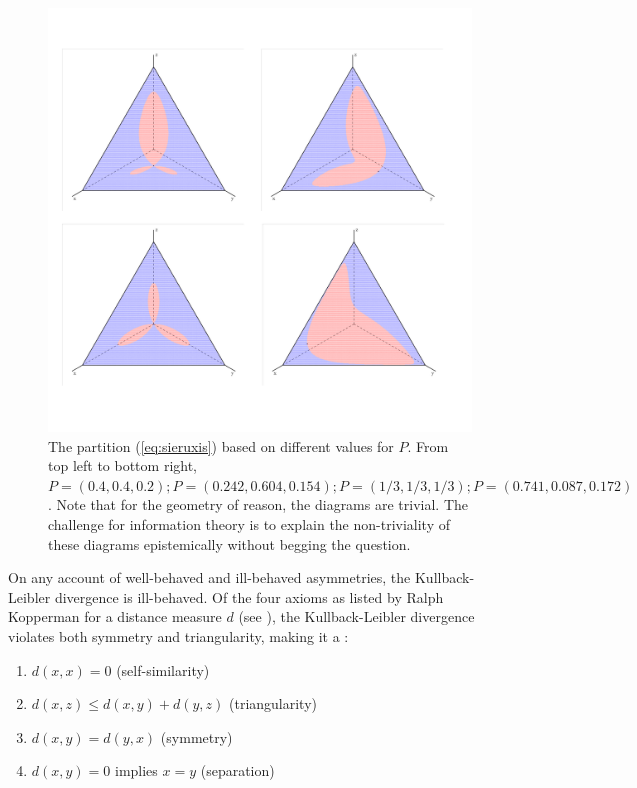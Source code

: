\documentclass[smallextended]{svjour3}       %
\begin{document}
\begin{figure}[ht]
  \begin{flushright}
    \begin{minipage}[h]{\linewidth}
      \includegraphics[width=\textwidth]{concat2.png}
      \caption{\footnotesize The partition (\ref{eq:sieruxis}) based
        on different values for $P$. From top left to bottom right,
        $P=(0.4,0.4,0.2); P=(0.242,0.604,0.154); P=(1/3,1/3,1/3);
        P=(0.741,0.087,0.172)$.
        Note that for the geometry of reason, the diagrams are
        trivial. The challenge for information theory is to explain
        the non-triviality of these diagrams epistemically without
        begging the question.}
      \label{fig:concat}
    \end{minipage}
  \end{flushright}
\end{figure}

On any account of well-behaved and ill-behaved asymmetries, the
Kullback-Leibler divergence is ill-behaved. Of the four axioms as
listed by Ralph Kopperman for a distance measure $d$ (see
), the Kullback-Leibler divergence violates
both symmetry and triangularity, making it a :

\begin{enumerate}[(m1)]
\item $d(x,x)=0$ (self-similarity)
\item $d(x,z)\leq{}d(x,y)+d(y,z)$ (triangularity)
\item $d(x,y)=d(y,x)$ (symmetry)
\item $d(x,y)=0$ implies $x=y$ (separation)
\end{enumerate}
\end{document}
